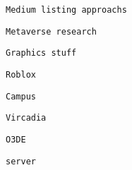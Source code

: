        
       
        \protect\hypertarget{ID_240146489}{}{}

\begin{verbatim}
Medium listing approachs
\end{verbatim}
       
     
   

   
   
    \protect\hypertarget{ID_584975900}{}{}

\begin{verbatim}
Metaverse research
\end{verbatim}

     
     
      \protect\hypertarget{ID_1063077439}{}{}

\begin{verbatim}
Graphics stuff
\end{verbatim}

       
       
        \protect\hypertarget{ID_60371915}{}{}

\begin{verbatim}
Roblox
\end{verbatim}

         
         
          \protect\hypertarget{ID_1633913075}{}{}

\begin{verbatim}
Campus
\end{verbatim}
         
       

       
       
        \protect\hypertarget{ID_1390151772}{}{}

\begin{verbatim}
Vircadia
\end{verbatim}
       

       
       
        \protect\hypertarget{ID_1186746626}{}{}

\begin{verbatim}
O3DE
\end{verbatim}

         
         
          \protect\hypertarget{ID_627692250}{}{}

\begin{verbatim}
server
\end{verbatim}
         


